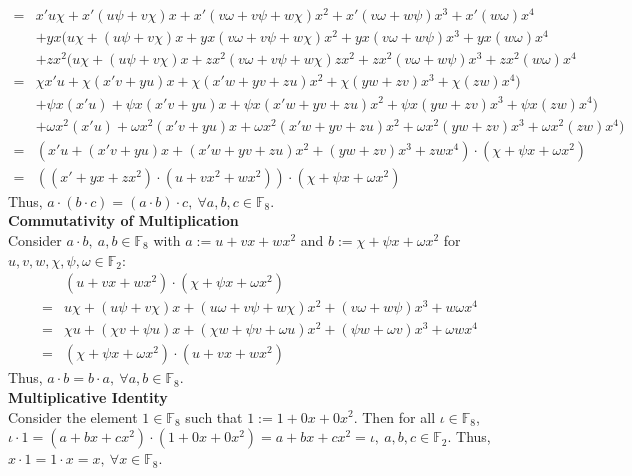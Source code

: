 \documentclass[11pt]{article}
\begin{document}
\begin{flushleft}
\begin{align*}
= & x'u \chi + x'(u \psi + v \chi)x + x'(v \omega + v \psi + w \chi ) x^2 + x'(v \omega + w \psi)x^3 + x'(w \omega) x^4 \\
& + yx(u \chi + (u \psi + v \chi)x + yx(v \omega + v \psi + w \chi ) x^2 + yx(v \omega + w \psi)x^3 + yx(w \omega) x^4 \\
& + zx^2(u \chi + (u \psi + v \chi)x + zx^2(v \omega + v \psi + w \chi ) zx^2 + zx^2(v \omega + w \psi)x^3 + zx^2(w \omega) x^4 \\
= & \chi x'u + \chi (x'v + yu)x +  \chi(x'w + yv + zu)x^2 + \chi(yw + zv) x^3 + \chi (zw) x^4) \\
& + \psi x(x'u) + \psi x(x'v + yu)x +  \psi x(x'w + yv + zu)x^2 + \psi x(yw + zv) x^3 + \psi x(zw) x^4) \\
& + \omega x^2(x'u) + \omega x^2(x'v + yu)x +  \omega x^2(x'w + yv + zu)x^2 + \omega x^2(yw + zv) x^3 + \omega x^2(zw) x^4) \\
= & (x'u + (x'v + yu)x + (x'w + yv + zu)x^2 + (yw + zv) x^3 + zw x^4) \cdot ( \chi + \psi x + \omega x^2) \\
= & ((x' + yx + zx^2) \cdot (u + vx^2 + wx^2)) \cdot (\chi + \psi x + \omega x^2)
\end{align*}
Thus, $a \cdot (b \cdot c) = (a \cdot b) \cdot c, \ \forall a,b,c \in \mathbb{F}_8$. \\
\bigskip
\textbf{Commutativity of Multiplication} \\
Consider $a \cdot b, \ a,b \in \mathbb{F}_8$ with $a := u + vx + wx^2$ and $b := \chi + \psi x + \omega x^2$ for $u,v,w,\chi,\psi,\omega \in \mathbb{F}_2$:
\begin{align*}
& (u + vx + wx^2) \cdot (\chi + \psi x + \omega x^2) \\
= & u \chi + (u \psi + v \chi)x + (u \omega + v \psi + w \chi ) x^2 + (v \omega + w \psi)x^3 + w \omega x^4 \\
= & \chi u + (\chi v + \psi u)x + (\chi w + \psi v + \omega u)x^2 + ( \psi w + \omega v)x^3 + \omega w x^4 \\
= & (\chi + \psi x + \omega x^2) \cdot (u + vx + wx^2)
\end{align*}
Thus, $a \cdot b = b \cdot a, \ \forall a,b \in \mathbb{F}_8$. \\
\bigskip
\textbf{Multiplicative Identity} \\
Consider the element $1 \in \mathbb{F}_8$ such that $1 := 1 + 0x + 0x^2$. Then for all $\iota \in \mathbb{F}_8$, $\iota \cdot 1 = (a + bx + cx^2) \cdot (1 + 0x + 0x^2) = a + bx + cx^2 = \iota, \ a,b,c \in  \mathbb{F}_2$. Thus, $x \cdot 1 = 1 \cdot x = x, \ \forall x \in \mathbb{F}_8$. \\

\end{flushleft}
\end{document}

